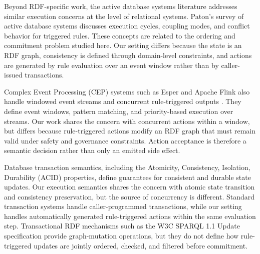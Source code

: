 \documentclass{ieeeaccess}
\theoremstyle{definition}
\theoremstyle{plain}
\theoremstyle{remark}
\begin{document}
Beyond RDF-specific work, the active database systems literature addresses similar execution concerns at the level of relational systems. Paton's survey of active database systems \cite{Paton1999ActiveDatabaseSystems} discusses execution cycles, coupling modes, and conflict behavior for triggered rules. These concepts are related to the ordering and commitment problem studied here. Our setting differs because the state is an RDF graph, consistency is defined through domain-level constraints, and actions are generated by rule evaluation over an event window rather than by caller-issued transactions.

Complex Event Processing (CEP) systems such as Esper and Apache Flink also handle windowed event streams and concurrent rule-triggered outputs \cite{CugolaMargara2012CEP}. They define event windows, pattern matching, and priority-based execution over streams. Our work shares the concern with concurrent actions within a window, but differs because rule-triggered actions modify an RDF graph that must remain valid under safety and governance constraints. Action acceptance is therefore a semantic decision rather than only an emitted side effect.

Database transaction semantics, including the Atomicity, Consistency, Isolation, Durability (ACID) properties, define guarantees for consistent and durable state updates. Our execution semantics shares the concern with atomic state transition and consistency preservation, but the source of concurrency is different. Standard transaction systems handle caller-programmed transactions, while our setting handles automatically generated rule-triggered actions within the same evaluation step. Transactional RDF mechanisms such as the W3C SPARQL 1.1 Update specification \cite{SPARQL11Update} provide graph-mutation operations, but they do not define how rule-triggered updates are jointly ordered, checked, and filtered before commitment.
\end{document}
